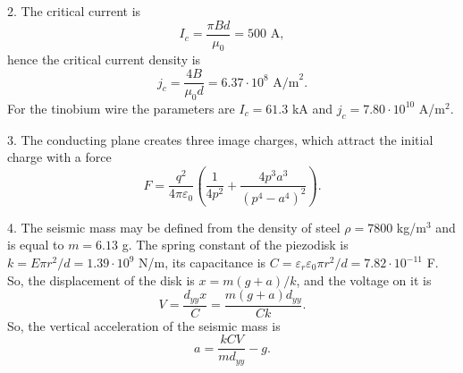 \documentclass[12pt,a4paper,pdflatex]{disser}
\begin{document}
2. The critical current is
$$
  I_c=\frac{\pi Bd}{\mu_0}=500 \text{ A},
$$
hence the critical current density is
$$
  j_c=\frac{4B}{\mu_0 d}=6.37\cdot 10^8 \text{ A/m}^2.
$$
For the tinobium wire the parameters are $I_c=61.3$ kA and $j_c=7.80\cdot 10^{10}$ A/m$^2$.

3. The conducting plane creates three image charges, which attract the initial charge with a force
$$
  F=\frac{q^2}{4\pi\varepsilon_0}\left(\frac{1}{4p^2}+\frac{4p^3 a^3}{\left(p^4-a^4\right)^2}\right).
$$

4. The seismic mass may be defined from the density of steel $\rho=7800$ kg/m$^3$ and is equal to $m=6.13$ g. The spring constant of the piezodisk is $k=E\pi r^2/d=1.39\cdot 10^9$ N/m, its capacitance is $C=\varepsilon_r \varepsilon_0 \pi r^2/d=7.82\cdot 10^{-11}$ F. So, the displacement of the disk is $x=m(g+a)/k$, and the voltage on it is
$$
  V=\frac{d_{yy}x}{C}=\frac{m(g+a) d_{yy}}{Ck}.
$$
So, the vertical acceleration of the seismic mass is
$$
  a=\frac{kCV}{md_{yy}}-g.
$$
\end{document}
